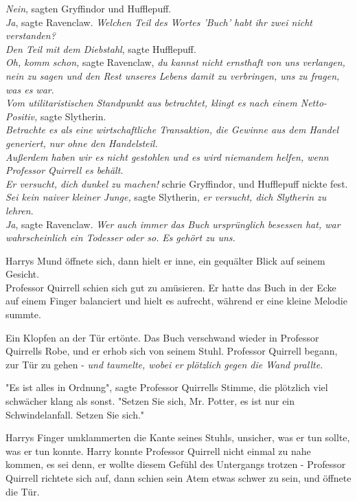 {\emph{Nein}, sagten Gryffindor und Hufflepuff.\\ \emph{Ja}, sagte Ravenclaw. \emph{Welchen Teil des Wortes 'Buch' habt ihr zwei nicht verstanden?}\\ \emph{Den Teil mit dem Diebstahl}, sagte Hufflepuff.\\ \emph{Oh, komm schon,} sagte Ravenclaw, \emph{du kannst nicht ernsthaft von uns verlangen, nein zu sagen und den Rest unseres Lebens damit zu verbringen, uns zu fragen, was es war}.\\ \emph{Vom utilitaristischen Standpunkt aus betrachtet, klingt es nach einem Netto-Positiv,} sagte Slytherin.\\ \emph{Betrachte es als eine wirtschaftliche Transaktion, die Gewinne aus dem Handel generiert, nur ohne den Handelsteil.\\ Außerdem haben wir es nicht gestohlen und es wird niemandem helfen, wenn Professor Quirrell es behält.}\\ \emph{Er versucht, dich dunkel zu machen!} schrie Gryffindor, und Hufflepuff nickte fest.\\ \emph{Sei kein naiver kleiner Junge,} sagte Slytherin, \emph{er versucht, dich Slytherin zu lehren}.\\ \emph{Ja}, sagte Ravenclaw. \emph{Wer auch immer das Buch ursprünglich besessen hat, war wahrscheinlich ein Todesser oder so.} \emph{Es gehört zu uns.}

Harrys Mund öffnete sich, dann hielt er inne, ein gequälter Blick auf seinem Gesicht.\\ Professor Quirrell schien sich gut zu amüsieren. Er hatte das Buch in der Ecke auf einem Finger balanciert und hielt es aufrecht, während er eine kleine Melodie summte.

Ein Klopfen an der Tür ertönte. Das Buch verschwand wieder in Professor Quirrells Robe, und er erhob sich von seinem Stuhl. Professor Quirrell begann, zur Tür zu gehen - \emph{und taumelte, wobei er plötzlich gegen die Wand prallte.}

"Es ist alles in Ordnung", sagte Professor Quirrells Stimme, die plötzlich viel schwächer klang als sonst. "Setzen Sie sich, Mr. Potter, es ist nur ein Schwindelanfall. Setzen Sie sich."

Harrys Finger umklammerten die Kante seines Stuhls, unsicher, was er tun sollte, was er tun konnte. Harry konnte Professor Quirrell nicht einmal zu nahe kommen, es sei denn, er wollte diesem Gefühl des Untergangs trotzen - Professor Quirrell richtete sich auf, dann schien sein Atem etwas schwer zu sein, und öffnete die Tür.

}
